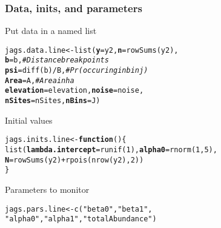 \documentclass[color=usenames,dvipsnames]{beamer}\usepackage[]{graphicx}\usepackage[]{xcolor}
\makeatletter
\newcommand{\hlnum}[1]{\textcolor[rgb]{0.69,0.494,0}{#1}}%
\newcommand{\hlsng}[1]{\textcolor[rgb]{0.749,0.012,0.012}{#1}}%
\newcommand{\hlcom}[1]{\textcolor[rgb]{0.514,0.506,0.514}{\textit{#1}}}%
\newcommand{\hlopt}[1]{\textcolor[rgb]{0,0,0}{#1}}%
\newcommand{\hldef}[1]{\textcolor[rgb]{0,0,0}{#1}}%
\newcommand{\hlkwa}[1]{\textcolor[rgb]{0,0,0}{\textbf{#1}}}%
\newcommand{\hlkwb}[1]{\textcolor[rgb]{0,0.341,0.682}{#1}}%
\newcommand{\hlkwc}[1]{\textcolor[rgb]{0,0,0}{\textbf{#1}}}%
\newcommand{\hlkwd}[1]{\textcolor[rgb]{0.004,0.004,0.506}{#1}}%
\newenvironment{kframe}{%
 \def\at@end@of@kframe{}%
 \ifinner\ifhmode%
  \def\at@end@of@kframe{\end{minipage}}%
  \begin{minipage}{\columnwidth}%
 \fi\fi%
 \def\FrameCommand##1{\hskip\@totalleftmargin \hskip-\fboxsep
 \colorbox{shadecolor}{##1}\hskip-\fboxsep
     \hskip-\linewidth \hskip-\@totalleftmargin \hskip\columnwidth}%
 \MakeFramed {\advance\hsize-\width
   \@totalleftmargin\z@ \linewidth\hsize
   \@setminipage}}%
 {\par\unskip\endMakeFramed%
 \at@end@of@kframe}
\newenvironment{knitrout}{}{} %
\makeatother
\begin{document}
\begin{frame}[fragile]
  \frametitle{Data, inits, and parameters}
  Put data in a named list
  \vspace{-12pt}
\begin{knitrout}\footnotesize
{}\color{fgcolor}\begin{kframe}
\begin{alltt}
\hldef{jags.data.line} \hlkwb{<-} \hlkwd{list}\hldef{(}\hlkwc{y}\hldef{=y2,} \hlkwc{n}\hldef{=}\hlkwd{rowSums}\hldef{(y2),}
                       \hlkwc{b}\hldef{=b,}           \hlcom{# Distance break points}
                       \hlkwc{psi}\hldef{=}\hlkwd{diff}\hldef{(b)}\hlopt{/}\hldef{B,} \hlcom{# Pr(occuring in bin j)}
                       \hlkwc{Area}\hldef{=A,}        \hlcom{# Area in ha}
                       \hlkwc{elevation}\hldef{=elevation,} \hlkwc{noise}\hldef{=noise,}
                       \hlkwc{nSites}\hldef{=nSites,} \hlkwc{nBins}\hldef{=J)}
\end{alltt}
\end{kframe}
\end{knitrout}
\pause
\vfill
  Initial values
  \vspace{-12pt}
\begin{knitrout}\footnotesize
{}\color{fgcolor}\begin{kframe}
\begin{alltt}
\hldef{jags.inits.line} \hlkwb{<-} \hlkwa{function}\hldef{() \{}
    \hlkwd{list}\hldef{(}\hlkwc{lambda.intercept}\hldef{=}\hlkwd{runif}\hldef{(}\hlnum{1}\hldef{),} \hlkwc{alpha0}\hldef{=}\hlkwd{rnorm}\hldef{(}\hlnum{1}\hldef{,} \hlnum{5}\hldef{),}
         \hlkwc{N}\hldef{=}\hlkwd{rowSums}\hldef{(y2)}\hlopt{+}\hlkwd{rpois}\hldef{(}\hlkwd{nrow}\hldef{(y2),} \hlnum{2}\hldef{))}
\hldef{\}}
\end{alltt}
\end{kframe}
\end{knitrout}
\pause
\vfill
  Parameters to monitor
  \vspace{-12pt}
\begin{knitrout}\small
{}\color{fgcolor}\begin{kframe}
\begin{alltt}
\hldef{jags.pars.line} \hlkwb{<-} \hlkwd{c}\hldef{(}\hlsng{"beta0"}\hldef{,} \hlsng{"beta1"}\hldef{,}
                    \hlsng{"alpha0"}\hldef{,} \hlsng{"alpha1"}\hldef{,} \hlsng{"totalAbundance"}\hldef{)}
\end{alltt}
\end{kframe}
\end{knitrout}
\end{frame}
\end{document}
